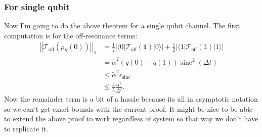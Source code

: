 \documentclass{article}
\newcommand{\off}{\text{off}}
\newcommand{\ket}[1]{|#1\rangle}
\newcommand{\bra}[1]{\langle #1|}
\newcommand{\norm}[1]{\left| \left| #1 \right| \right|}
\newcommand{\identity}{\mathds{1}}
\DeclareMathOperator{\sinc}{sinc}
\begin{document}
\subsubsection{For single qubit}
Now I'm going to do the above theorem for a single qubit channel. The first computation is for the off-resonance terms:
\begin{align}
    \norm{\mathcal{T}_{\off}(\rho_S(0))}_1 &=  \frac{1}{2} \left| \bra{0} \mathcal{T}_{\off}(\identity) \ket{0} \right| + \frac{1}{2} \left| \bra{1} \mathcal{T}_{\off}(\identity) \ket{1} \right| \\
    &= \widetilde{\alpha}^2 (q(0) - q(1)) \sinc^2( \Delta t ) \\
    &\le \widetilde{\alpha}^2 \epsilon_{\sinc} \\
    &\le \frac{4}{5} \frac{\alpha^2}{\Delta^2}.
\end{align}
Now the remainder term is a bit of a hassle because its all in asymptotic notation so we can't get exact bounds with the current proof. It might be nice to be able to extend the above proof to work regardless of system so that way we don't have to replicate it.
\end{document}
